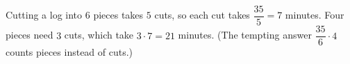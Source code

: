 Cutting a log into $6$ pieces takes $5$ cuts, so each cut takes $\dfrac{35}{5}=7$ minutes. Four pieces need $3$ cuts, which take $3\cdot7=\boxed{21}$ minutes. (The tempting answer $\dfrac{35}{6}\cdot4$ counts pieces instead of cuts.)
